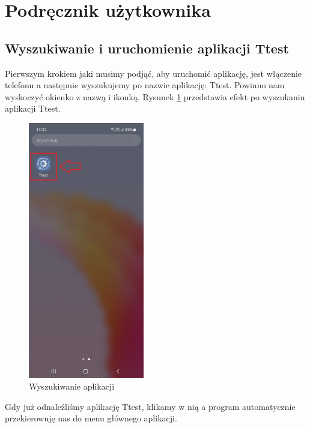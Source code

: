 	\newpage
\section{Podręcznik użytkownika}  %


\subsection{Wyszukiwanie i uruchomienie aplikacji Ttest} 

\hspace{0.60cm}Pierwszym krokiem jaki musimy podjąć, aby uruchomić aplikację, jest włączenie telefonu a następnie wyszukujemy po nazwie aplikację: Ttest. Powinno nam wyskoczyć okienko z nazwą i ikonką. Rysunek \ref{rys:ikona_6} przedstawia efekt po wyszukaniu aplikacji Ttest.

\begin{figure}[!hbt]
	\begin{center}
		\includegraphics[angle=360, width=0.45\textwidth]{rys/punkt6/ikona.jpg}
		\caption{Wyszukiwanie aplikacji}
		\label{rys:ikona_6}
	\end{center}
\end{figure}

Gdy już odnaleźliśmy aplikację Ttest, klikamy w nią a program automatycznie przekierowuję nas do menu głównego aplikacji. 

